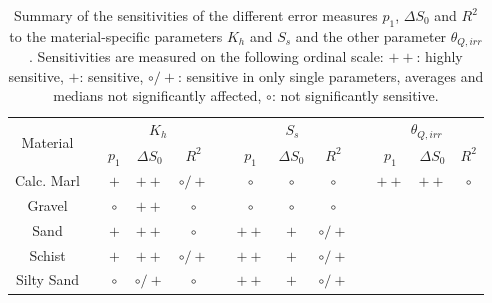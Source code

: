 \vspace{3cm}

\begin{table}[t]
    \label{Tab-SAOverview}
    \caption{Summary of the sensitivities of the different error measures $p_1$, $\Delta S_0$ and $R^2$ to the material-specific parameters $K_h$ and $S_s$ and the other parameter $\theta_{Q,irr}$. Sensitivities are measured on the following ordinal scale: $\bm{++}$: highly sensitive, $\bm{+}$: sensitive, $\bm{\circ /+}$: sensitive in only single parameters, averages and medians not significantly affected, $\bm{\circ}$: not significantly sensitive.}
    \begin{tabular}{ccccccccccccc}
        \multirow{2}{*}{Material} &  & \multicolumn{3}{c}{$K_h$}                        &  & \multicolumn{3}{c}{$S_s$}                     &                       & \multicolumn{3}{c}{$\theta_{Q,irr}$}    \\
                                  &  & $p_1$        & $\Delta S_0$    & $R^2$           &  & $p_1$        & $\Delta S_0$ & $R^2$           &                       & $p_1$     & $\Delta S_0$ & $R^2$        \\ \hline
        Calc. Marl                &  & $\bm{+}$     & $\bm{++}$       & $\bm{\circ /+}$ &  & $\bm{\circ}$ & $\bm{\circ}$ & $\bm{\circ}$    & \multicolumn{1}{c|}{} & $\bm{++}$ & $\bm{++}$    & $\bm{\circ}$ \\
        Gravel                    &  & $\bm{\circ}$ & $\bm{++}$       & $\bm{\circ}$    &  & $\bm{\circ}$ & $\bm{\circ}$ & $\bm{\circ}$    & \multicolumn{1}{c|}{} &           &              &              \\
        Sand                      &  & $\bm{+}$     & $\bm{++}$       & $\bm{\circ}$    &  & $\bm{++}$    & $\bm{+}$     & $\bm{\circ /+}$ & \multicolumn{1}{c|}{} &           &              &              \\
        Schist                    &  & $\bm{+}$     & $\bm{++}$       & $\bm{\circ /+}$ &  & $\bm{++}$    & $\bm{+}$     & $\bm{\circ /+}$ & \multicolumn{1}{c|}{} &           &              &              \\
        Silty Sand                &  & $\bm{\circ}$ & $\bm{\circ /+}$ & $\bm{\circ}$    &  & $\bm{++}$    & $\bm{+}$     & $\bm{\circ /+}$ & \multicolumn{1}{c|}{} &           &              &             
    \end{tabular}
\end{table}


